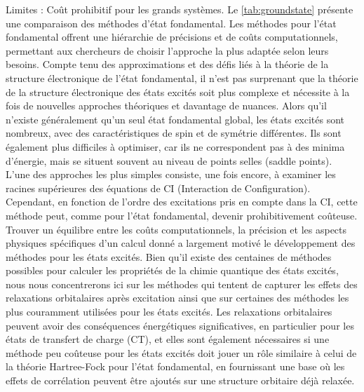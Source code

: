 \markdownRendererUlEndTight \markdownRendererUlItemEnd 
\markdownRendererUlItem Limites :\markdownRendererInterblockSeparator
{}\markdownRendererUlBeginTight
\markdownRendererUlItem Coût prohibitif pour les grands systèmes.\markdownRendererUlItemEnd 
\markdownRendererUlEndTight \markdownRendererUlItemEnd 
\markdownRendererUlEnd \markdownRendererOlItemEnd 
\markdownRendererOlEndTight \markdownRendererInterblockSeparator
{}Le \autoref{tab:groundstate} présente une comparaison des méthodes d'état fondamental.\markdownRendererInterblockSeparator
{}\markdownRendererInterblockSeparator
{}Les méthodes pour l’état fondamental offrent une hiérarchie de précisions et de coûts computationnels, permettant aux chercheurs de choisir l’approche la plus adaptée selon leurs besoins.\markdownRendererParagraphSeparator
{}
\markdownRendererSectionEnd 
\markdownRendererSectionEnd \markdownRendererSectionBegin
{}\markdownRendererInterblockSeparator
{}Compte tenu des approximations et des défis liés à la théorie de la structure électronique de l'état fondamental, il n'est pas surprenant que la théorie de la structure électronique des états excités soit plus complexe et nécessite à la fois de nouvelles approches théoriques et davantage de nuances. Alors qu'il n'existe généralement qu'un seul état fondamental global, les états excités sont nombreux, avec des caractéristiques de spin et de symétrie différentes. Ils sont également plus difficiles à optimiser, car ils ne correspondent pas à des minima d'énergie, mais se situent souvent au niveau de points selles (saddle points).\markdownRendererParagraphSeparator
{}L'une des approches les plus simples consiste, une fois encore, à examiner les racines supérieures des équations de CI (Interaction de Configuration). Cependant, en fonction de l'ordre des excitations pris en compte dans la CI, cette méthode peut, comme pour l'état fondamental, devenir prohibitivement coûteuse. Trouver un équilibre entre les coûts computationnels, la précision et les aspects physiques spécifiques d'un calcul donné a largement motivé le développement des méthodes pour les états excités.\markdownRendererParagraphSeparator
{}Bien qu'il existe des centaines de méthodes possibles pour calculer les propriétés de la chimie quantique des états excités, nous nous concentrerons ici sur les méthodes qui tentent de capturer les effets des relaxations orbitalaires après excitation ainsi que sur certaines des méthodes les plus couramment utilisées pour les états excités. Les relaxations orbitalaires peuvent avoir des conséquences énergétiques significatives, en particulier pour les états de transfert de charge (CT), et elles sont également nécessaires si une méthode peu coûteuse pour les états excités doit jouer un rôle similaire à celui de la théorie Hartree-Fock pour l'état fondamental, en fournissant une base où les effets de corrélation peuvent être ajoutés sur une structure orbitaire déjà relaxée.\markdownRendererInterblockSeparator
